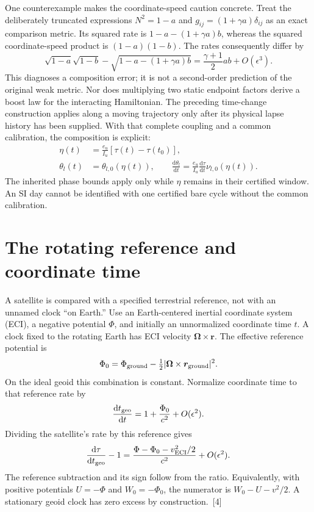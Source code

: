 \documentclass[10pt,twocolumn,letterpaper]{article}
\newcommand{\dd}{\mathrm{d}}
\begin{document}
One counterexample makes the coordinate-speed caution concrete. Treat the deliberately truncated expressions $N^2=1-a$ and $g_{ij}=(1+\gamma a)\delta_{ij}$ as an exact comparison metric. Its squared rate is $1-a-(1+\gamma a)b$, whereas the squared coordinate-speed product is $(1-a)(1-b)$. The rates consequently differ by
\[
 \sqrt{1-a}\sqrt{1-b}
 -\sqrt{1-a-(1+\gamma a)b}
 =\frac{\gamma+1}{2}ab+O(\epsilon^3).
\]
This diagnoses a composition error; it is not a second-order prediction of the original weak metric. Nor does multiplying two static endpoint factors derive a boost law for the interacting Hamiltonian. The preceding time-change construction applies along a moving trajectory only after its physical lapse history has been supplied.
With that complete coupling and a common calibration, the composition is explicit:
\[
\begin{aligned}
 \eta(t)&=\frac{e_u}{I_u}[\tau(t)-\tau(t_0)],\\
 \theta_l(t)&=\theta_{l,0}(\eta(t)),\qquad
 \frac{\dd\theta_l}{\dd t}=\frac{e_u}{I_u}\frac{\dd\tau}{\dd t}\nu_{l,0}(\eta(t)).
\end{aligned}
\]
The inherited phase bounds apply only while $\eta$ remains in their certified window. An SI day cannot be identified with one certified bare cycle without the common calibration.


\section{The rotating reference and coordinate time}
A satellite is compared with a specified terrestrial reference, not with an unnamed clock ``on Earth.'' Use an Earth-centered inertial coordinate system (ECI), a negative potential $\Phi$, and initially an unnormalized coordinate time $t$. A clock fixed to the rotating Earth has ECI velocity $\bm\Omega\mathbin\times\bm r$. The effective reference potential is
\[
 \Phi_0=\Phi_{\rm ground}
       -\tfrac 12|\bm\Omega\mathbin\times\bm r_{\rm ground}|^2.
\]
On the ideal geoid this combination is constant. Normalize coordinate time to that reference rate by
\[
 \frac{\dd t_{\rm geo}}{\dd t}=1+\frac{\Phi_0}{c^2}+O(\epsilon^2).
\]
Dividing the satellite's rate by this reference gives
\begin{equation}
 \frac{\dd\tau}{\dd t_{\rm geo}}-1
 =\frac{\Phi-\Phi_0-v_{\rm ECI}^2/2}{c^2}
 +O(\epsilon^2).
 \label{eq:geoid-rate}
\end{equation}
The reference subtraction and its sign follow from the ratio. Equivalently, with positive potentials $U=-\Phi$ and $W_0=-\Phi_0$, the numerator is $W_0-U-v^2/2$. A stationary geoid clock has zero excess by construction.~[4]
\end{document}
